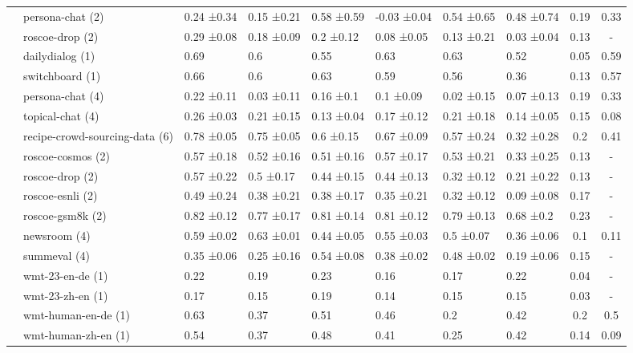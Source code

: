 \begin{tabular}{llllllll|cc}
 & \cellcolor{red!25}persona-chat (2) & 0.24 ±0.34 & 0.15 ±0.21 & 0.58 ±0.59 & -0.03 ±0.04 & 0.54 ±0.65 & 0.48 ±0.74 & 0.19 & 0.33 \\
 & \cellcolor{red!25}roscoe-drop (2) & 0.29 ±0.08 & 0.18 ±0.09 & 0.2 ±0.12 & 0.08 ±0.05 & 0.13 ±0.21 & 0.03 ±0.04 & 0.13 & - \\
 & \cellcolor{blue!25}dailydialog (1) & 0.69  & 0.6  & 0.55  & 0.63  & 0.63  & 0.52  & 0.05 & 0.59 \\
 & \cellcolor{blue!25}switchboard (1) & 0.66  & 0.6  & 0.63  & 0.59  & 0.56  & 0.36  & 0.13 & 0.57 \\
 & \cellcolor{red!25}persona-chat (4) & 0.22 ±0.11 & 0.03 ±0.11 & 0.16 ±0.1 & 0.1 ±0.09 & 0.02 ±0.15 & 0.07 ±0.13 & 0.19 & 0.33 \\
 & \cellcolor{red!25}topical-chat (4) & 0.26 ±0.03 & 0.21 ±0.15 & 0.13 ±0.04 & 0.17 ±0.12 & 0.21 ±0.18 & 0.14 ±0.05 & 0.15 & 0.08 \\
 & \cellcolor{red!25}recipe-crowd-sourcing-data (6) & 0.78 ±0.05 & 0.75 ±0.05 & 0.6 ±0.15 & 0.67 ±0.09 & 0.57 ±0.24 & 0.32 ±0.28 & 0.2 & 0.41 \\
 & \cellcolor{red!25}roscoe-cosmos (2) & 0.57 ±0.18 & 0.52 ±0.16 & 0.51 ±0.16 & 0.57 ±0.17 & 0.53 ±0.21 & 0.33 ±0.25 & 0.13 & - \\
 & \cellcolor{red!25}roscoe-drop (2) & 0.57 ±0.22 & 0.5 ±0.17 & 0.44 ±0.15 & 0.44 ±0.13 & 0.32 ±0.12 & 0.21 ±0.22 & 0.13 & - \\
 & \cellcolor{red!25}roscoe-esnli (2) & 0.49 ±0.24 & 0.38 ±0.21 & 0.38 ±0.17 & 0.35 ±0.21 & 0.32 ±0.12 & 0.09 ±0.08 & 0.17 & - \\
 & \cellcolor{red!25}roscoe-gsm8k (2) & 0.82 ±0.12 & 0.77 ±0.17 & 0.81 ±0.14 & 0.81 ±0.12 & 0.79 ±0.13 & 0.68 ±0.2 & 0.23 & - \\
 & \cellcolor{red!25}newsroom (4) & 0.59 ±0.02 & 0.63 ±0.01 & 0.44 ±0.05 & 0.55 ±0.03 & 0.5 ±0.07 & 0.36 ±0.06 & 0.1 & 0.11 \\
 & \cellcolor{red!25}summeval (4) & 0.35 ±0.06 & 0.25 ±0.16 & 0.54 ±0.08 & 0.38 ±0.02 & 0.48 ±0.02 & 0.19 ±0.06 & 0.15 & - \\
 & \cellcolor{red!25}wmt-23-en-de (1) & 0.22  & 0.19  & 0.23  & 0.16  & 0.17  & 0.22  & 0.04 & - \\
 & \cellcolor{red!25}wmt-23-zh-en (1) & 0.17  & 0.15  & 0.19  & 0.14  & 0.15  & 0.15  & 0.03 & - \\
 & \cellcolor{red!25}wmt-human-en-de (1) & 0.63  & 0.37  & 0.51  & 0.46  & 0.2  & 0.42  & 0.2 & 0.5 \\
 & \cellcolor{red!25}wmt-human-zh-en (1) & 0.54  & 0.37  & 0.48  & 0.41  & 0.25  & 0.42  & 0.14 & 0.09 \\
\bottomrule
\end{tabular}
